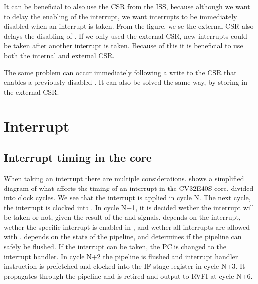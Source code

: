 It can be beneficial to also use the CSR from the ISS, because although we want to delay the enabling of the interrupt, we want interrupts to be immediately disabled when an interrupt is taken. From the figure, we se the external CSR also delays the disabling of . If we only used the external CSR, new interrupts could be taken after another interrupt is taken. Because of this it is beneficial to use both the internal and external CSR.

The same problem can occur immediately following a write to the  CSR that enables a previously disabled . It can also be solved the same way, by storing  in the external CSR.




\section{Interrupt}
\label{sec:ps_interrupt}

\subsection{Interrupt timing in the core}

When taking an interrupt there are multiple considerations.  shows a simplified diagram of what affects the timing of an interrupt in the CV32E40S core, divided into clock cycles. We see that the interrupt is applied in cycle N. The next cycle, the interrupt is clocked into . In cycle N+1, it is decided wether the interrupt will be taken or not, given the result of the  and  signals.  depends on the interrupt, wether the specific interrupt is enabled in , and wether all interrupts are allowed with .  depends on the state of the pipeline, and determines if the pipeline can safely be flushed. If the interrupt can be taken, the PC is changed to the interrupt handler. In cycle N+2 the pipeline is flushed and interrupt handler instruction is prefetched and clocked into the IF stage register in cycle N+3. It propagates through the pipeline and is retired and output to RVFI at cycle N+6.

